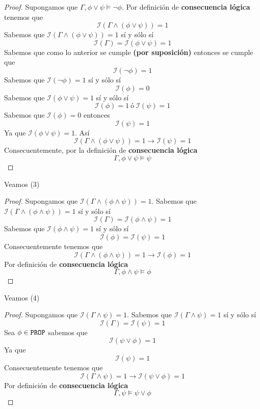 \documentclass[a4paper]{article}
\begin{document}
\begin{proof}
    Supongamos que $\Gamma,\phi\lor\psi\models \neg\phi$. Por definición de \textbf{consecuencia 
    lógica} tenemos que
    \[
        \mathcal{I}\left(\Gamma \land \left(\phi\lor\psi\right)\right) = 1
    \]
    Sabemos que \(\mathcal{I}\left(\Gamma \land \left(\phi\lor\psi\right)\right) = 1\) sí y sólo sí
    \[
        \mathcal{I}\left(\Gamma\right) = \mathcal{I}\left(\phi\lor\psi\right) = 1  
    \]
    Sabemos que como lo anterior se cumple \textbf{(por suposición)} entonces se cumple que
    \[
        \mathcal{I}\left(\neg \phi\right) = 1
    \]
    Sabemos que \(\mathcal{I}\left(\neg \phi\right) = 1\) sí y sólo sí
    \[
        \mathcal{I}\left(\phi\right) = 0
    \]
    Sabemos que \(\mathcal{I}\left(\phi\lor\psi\right) = 1\) sí y sólo sí
    \[
        \mathcal{I}\left(\phi\right) = 1 \ \text{ó} \ \mathcal{I}\left(\psi\right) = 1
    \]
    Sabemos que \(\mathcal{I}\left(\phi\right) = 0\) entonces
    \[
        \mathcal{I}\left(\psi\right) = 1
    \]
    Ya que \(\mathcal{I}\left(\phi\lor\psi\right) = 1\).
    \newline
    Así 
    \[
        \mathcal{I}\left(\Gamma \land \left(\phi\lor\psi\right)\right) = 1 \to \mathcal{I}\left(\psi\right) = 1
    \]
    Consecuentemente, por la definición de \textbf{consecuencia lógica}
    \[
        \Gamma, \phi\lor\psi \models \psi
    \]
\end{proof}
Veamos (3)
\begin{proof}
    Supongamos que \(\mathcal{I}\left(\Gamma \land \left(\phi \land \psi\right)\right) = 1\). 
    \newline 
    Sabemos que \(\mathcal{I}\left(\Gamma \land \left(\phi \land \psi\right)\right) = 1\) sí y sólo sí
    \[
        \mathcal{I}\left(\Gamma \right) = 
        \mathcal{I}\left(\phi \land \psi\right) = 1
    \]
    Sabemos que \(\mathcal{I}\left(\phi \land \psi\right) = 1\) sí y sólo sí
    \[
        \mathcal{I}\left(\phi\right) = \mathcal{I}\left(\psi\right) = 1
    \]
    Consecuentemente tenemos que
    \[
        \mathcal{I}\left(\Gamma \land \left( \phi \land \psi \right)\right) = 1 \to 
        \mathcal{I}\left(\phi\right) = 1
    \]
    Por definición de \textbf{consecuencia lógica}
    \[
        \Gamma, \phi \land \psi \models \phi
    \]
\end{proof}
Veamos (4)
\begin{proof}
    Supongamos que \(\mathcal{I}\left(\Gamma \land \psi\right) = 1\). 
    \newline
    Sabemos que \(\mathcal{I}\left(\Gamma \land \psi\right) = 1\) sí y sólo sí
    \[
        \mathcal{I}\left(\Gamma\right) = \mathcal{I}\left(\psi\right) = 1
    \]
    Sea \(\phi \in \text{\texttt{PROP}}\) sabemos que 
    \[
        \mathcal{I}\left(\psi \lor \phi\right) = 1
    \]
    Ya que
    \[
        \mathcal{I}\left(\psi\right) = 1        
    \]
    Consecuentemente tenemos que
    \[
        \mathcal{I}\left(\Gamma \land \psi \right) = 1 \to 
        \mathcal{I}\left(\psi \lor \phi\right) = 1
    \]
    Por definición de \textbf{consecuencia lógica}
    \[
        \Gamma, \psi \models \psi \lor \phi
    \]
\end{proof}
\newpage
\end{document}

